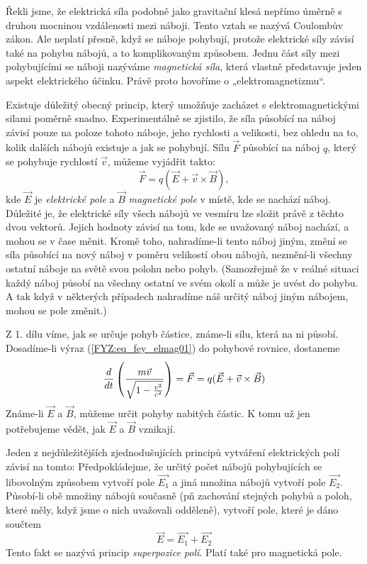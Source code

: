     Řekli jsme, že elektrická síla podobně jako gravitační klesá nepřímo úměrně s druhou mocninou   
    vzdálenosti mezi náboji. Tento vztah se nazývá Coulombův zákon. Ale neplatí přesně, když se 
    náboje pohybují, protože elektrické síly závisí také na pohybu nábojů, a to komplikovaným 
    způsobem. Jednu část síly mezi pohybujícími se náboji nazýváme \emph{magnetická síla}, která 
    vlastně představuje jeden aspekt elektrického účinku. Právě proto hovoříme o „elektromagnetizmu“.
    
    Existuje důležitý obecný princip, který umožňuje zacházet s elektromagnetickými silami poměrně 
    snadno. Experimentálně se zjistilo, že síla působící na náboj závisí pouze na poloze tohoto 
    náboje, jeho rychlosti a velikosti, bez ohledu na to, kolik dalších nábojů existuje a jak se 
    pohybují. Sílu \(\vec{F}\) působící na náboj \(q\), který se pohybuje rychlostí \(\vec{v}\), 
    můžeme vyjádřit takto:
    \begin{equation}\label{FYZ:eq_fey_elmag01}
      \vec{F} = q(\vec{E}+\vec{v}\times\vec{B}),
    \end{equation}
    kde \(\vec{E}\) je \emph{elektrické pole} a \(\vec{B}\) \emph{magnetické pole} v místě, kde se 
    nachází náboj. Důležité je, že elektrické síly všech nábojů ve vesmíru lze složit právě z těchto 
    dvou vektorů. Jejich hodnoty závisí na tom, kde se uvažovaný náboj nachází, a mohou se v čase 
    měnit. Kromě toho, nahradíme-li tento náboj jiným, změní se síla působící na nový náboj v poměru 
    velikostí obou nábojů, nezmění-li všechny ostatní náboje na světě svou polohu nebo pohyb. 
    (Samozřejmě že v reálné situaci každý náboj působí na všechny ostatní ve svém okolí a může je 
    uvést do pohybu. A tak když v některých případech nahradíme náš určitý náboj jiným nábojem, 
    mohou se pole změnit.)
    
    Z 1. dílu víme, jak se určuje pohyb částice, známe-li sílu, která na ni působí. Dosadíme-li 
    výraz (\ref{FYZ:eq_fey_elmag01}) do pohybové rovnice, dostaneme
    \begin{equation}\label{FYZ:eq_fey_elmag02}
      \frac{d  }{d t}\left(\frac{m\vec{v}}{\sqrt{1-\frac{v^2}{c^2}}}\right) = \vec{F} =
      q(\vec{E}+\vec{v}\times\vec{B})
    \end{equation}
    Známe-li \(\vec{E}\) a \(\vec{B}\), můžeme určit pohyby nabitých částic. K tomu už jen 
    potřebujeme vědět, jak \(\vec{E}\) a \(\vec{B}\) vznikají.
    
    Jeden z nejdůležitějších zjednodušujících principů vytváření elektrických polí závisí na tomto:
    Předpokládejme, že určitý počet nábojů pohybujících se libovolným způsobem vytvoří pole 
    \(\vec{E_1}\) a jiná množina nábojů vytvoří pole \(\vec{E_2}\). Působí-li obě množiny nábojů 
    současně (pň zachování 
    stejných pohybů a poloh, které měly, když jsme o nich uvažovali odděleně), vytvoří pole, které je dáno 
    součtem
    \begin{equation}\label{FYZ:eq_fey_elmag03}
      \vec{E} = \vec{E_1} + \vec{E_2}
    \end{equation}
    Tento fakt se nazývá princip \emph{superpozice polí}. Platí také pro magnetická pole.
    
